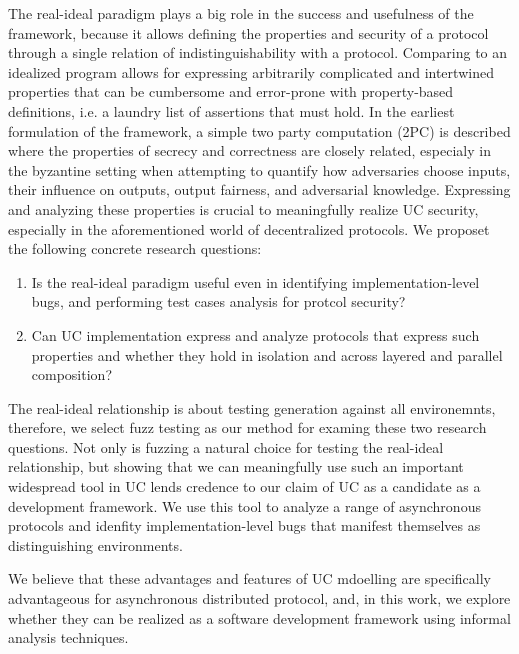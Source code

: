 The real-ideal paradigm plays a big role in the success and usefulness of the framework, because it allows defining the properties and security of a protocol through a single relation of indistinguishability with a protocol.
Comparing to an idealized program allows for expressing arbitrarily complicated and intertwined properties that can be cumbersome and error-prone with property-based definitions, i.e. a laundry list of assertions that must hold. 
In the earliest formulation of the framework, a simple two party computation (2PC) is described where the properties of secrecy and correctness are closely related, especialy in the byzantine setting when attempting to quantify how adversaries choose inputs, their influence on outputs, output fairness, and adversarial knowledge.
Expressing and analyzing these properties is crucial to meaningfully realize UC security, especially in the aforementioned world of decentralized protocols.
We proposet the following concrete research questions:
\begin{enumerate}[label=RQ\arabic*.]
\item Is the real-ideal paradigm useful even in identifying implementation-level bugs, and performing test cases analysis for protcol security?
\item Can UC implementation express and analyze protocols that express such properties and whether they hold in isolation and across layered and parallel composition?
\end{enumerate}
The real-ideal relationship is about testing generation against all environemnts, therefore, we select fuzz testing as our method for examing these two research questions. 
Not only is fuzzing a natural choice for testing the real-ideal relationship, but showing that we can meaningfully use such an important widespread tool in UC lends credence to our claim of UC as a candidate as a development framework. 
We use this tool to analyze a range of asynchronous protocols and idenfity implementation-level bugs that manifest themselves as distinguishing environments.




We believe that these advantages and features of UC mdoelling are specifically advantageous for asynchronous distributed protocol, and, in this work, we explore whether they can be realized as a software development framework using informal analysis techniques.


